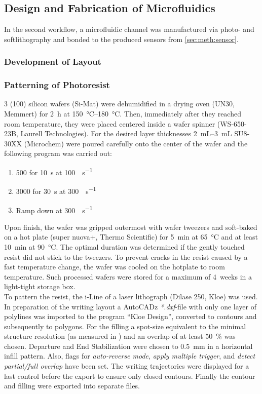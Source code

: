 \subsection{Design and Fabrication of Microfluidics}
In the second workflow, a microfluidic channel was manufactured via photo- and softlithography and bonded to the produced sensors from \ref{sec:meth:sensor}.
\subsubsection{Development of Layout}

\subsubsection{Patterning of Photoresist}
\SI{3}{\inch} (100) silicon wafers (Si-Mat) were dehumidified in a drying oven (UN30, Memmert) for \SI{2}{\hour} at \SIrange{150}{180}{\degreeCelsius}. Then, immediately after they reached room temperature, they were placed centered inside a wafer spinner (WS-650-23B, Laurell Technologies). For the desired layer thicknesses \SIrange{2}{3}{\milli\liter} SU8-30XX (Microchem) were poured carefully onto the center of the wafer and the following program was carried out:
\begin{enumerate}[noitemsep]
\item \SI{500}{\rpm} for \SI{10}{s} at \SI{100}{\rpm\per\second}
\item \SI{3000}{\rpm} for \SI{30}{s} at \SI{300}{\rpm\per\second}
\item Ramp down at \SI{300}{\rpm\per\second}
\end{enumerate}
Upon finish, the wafer was gripped outermost with wafer tweezers and soft-baked on a hot plate (super nuova+, Thermo Scientific) for \SI{5}{\minute} at \SI{65}{\degreeCelsius} and at least \SI{10}{\minute} at \SI{90}{\degreeCelsius}. The optimal duration was determined if the gently touched resist did not stick to the tweezers. To prevent cracks in the resist caused by a fast temperature change, the wafer was cooled on the hotplate to room	temperature. Such processed wafers were stored for a maximum of \SI{4}{weeks} in a light-tight storage box.\\
To pattern the resist, the i-Line of a laser lithograph (Dilase 250, Kloe) was used. In preparation of the writing layout a AutoCADz \textit{*.dxf}-file with only one layer of polylines was imported to the program ``Kloe Design'', converted to contours and subsequently to polygons. For the filling a spot-size equivalent to the minimal structure resolution (as measured in \citet{lit:tech:rojda2020}) and an overlap of at least \SI{50}{\percent} was chosen. Departure and End Stabilization were chosen to \SI{.5}{\milli\meter} in a horizontal infill pattern. Also, flags for \textit{auto-reverse mode}, \textit{apply multiple trigger}, and \textit{detect partial/full overlap} have been set.  The writing trajectories were displayed for a last control before the export to ensure only closed contours. Finally the contour and filling were exported into separate files.\\
